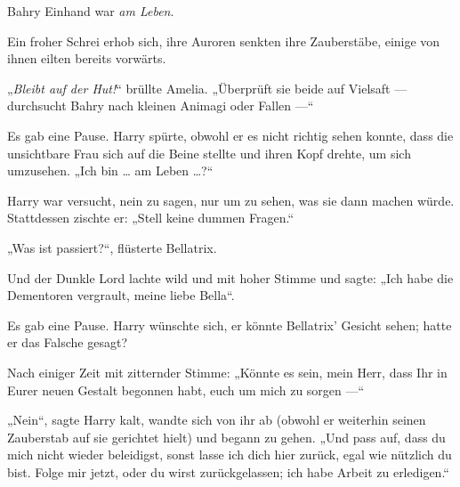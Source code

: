 Bahry Einhand war \emph{am Leben}.

Ein froher Schrei erhob sich, ihre Auroren senkten ihre Zauberstäbe, einige von ihnen eilten bereits vorwärts.

„\emph{Bleibt auf der Hut!}“ brüllte Amelia. „Überprüft sie beide auf Vielsaft — durchsucht Bahry nach kleinen Animagi oder Fallen —“

\later

 

Es gab eine Pause. Harry spürte, obwohl er es nicht richtig sehen konnte, dass die unsichtbare Frau sich auf die Beine stellte und ihren Kopf drehte, um sich umzusehen.
„Ich bin … am Leben …?“

Harry war versucht, nein zu sagen, nur um zu sehen, was sie dann machen würde. Stattdessen zischte er:
„Stell keine dummen Fragen.“

„Was ist passiert?“, flüsterte Bellatrix.

Und der Dunkle Lord lachte wild und mit hoher Stimme und sagte:
„Ich habe die Dementoren vergrault, meine liebe Bella“.

Es gab eine Pause. Harry wünschte sich, er könnte Bellatrix’ Gesicht sehen; hatte er das Falsche gesagt?

Nach einiger Zeit mit zitternder Stimme:
„Könnte es sein, mein Herr, dass Ihr in Eurer neuen Gestalt begonnen habt, euch um mich zu sorgen —“

„Nein“, sagte Harry kalt, wandte sich von ihr ab (obwohl er weiterhin seinen Zauberstab auf sie gerichtet hielt) und begann zu gehen.
„Und pass auf, dass du mich nicht wieder beleidigst, sonst lasse ich dich hier zurück, egal wie nützlich du bist. Folge mir jetzt, oder du wirst zurückgelassen; ich habe Arbeit zu erledigen.“

